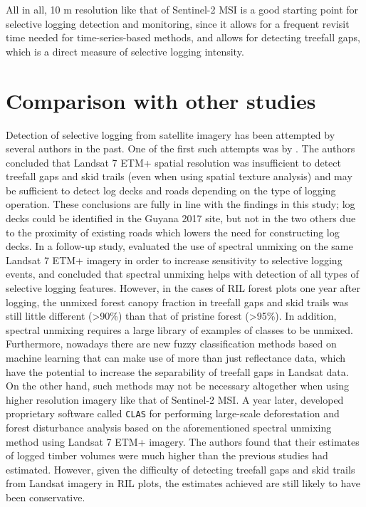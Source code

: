 \documentclass[a4paper,12pt]{scrbook}
\begin{document}
All in all, 10 m resolution like that of Sentinel-2 \ac{MSI} is a good starting point for selective logging detection and monitoring, since it allows for a frequent revisit time needed for time-series-based methods, and allows for detecting treefall gaps, which is a direct measure of selective logging intensity.

\section{Comparison with other studies}

Detection of selective logging from satellite imagery has been attempted by several authors in the past. One of the first such attempts was by \citet{asner_remote_2002}. The authors concluded that Landsat 7 \ac{ETM+} spatial resolution was insufficient to detect treefall gaps and skid trails (even when using spatial texture analysis) and may be sufficient to detect log decks and roads depending on the type of logging operation. These conclusions are fully in line with the findings in this study; log decks could be identified in the Guyana 2017 site, but not in the two others due to the proximity of existing roads which lowers the need for constructing log decks. In a follow-up study, \citet{asner_canopy_2004} evaluated the use of spectral unmixing on the same Landsat 7 \ac{ETM+} imagery in order to increase sensitivity to selective logging events, and concluded that spectral unmixing helps with detection of all types of selective logging features. However, in the cases of \ac{RIL} forest plots one year after logging, the unmixed forest canopy fraction in treefall gaps and skid trails was still little different (>90\%) than that of pristine forest (>95\%). In addition, spectral unmixing requires a large library of examples of classes to be unmixed. Furthermore, nowadays there are new fuzzy classification methods based on machine learning that can make use of more than just reflectance data, which have the potential to increase the separability of treefall gaps in Landsat data. On the other hand, such methods may not be necessary altogether when using higher resolution imagery like that of Sentinel-2 \ac{MSI}. A year later, \citet{asner_selective_2005} developed proprietary software called \texttt{CLAS} for performing large-scale deforestation and forest disturbance analysis based on the aforementioned spectral unmixing method using Landsat 7 \ac{ETM+} imagery. The authors found that their estimates of logged timber volumes were much higher than the previous studies had estimated. However, given the difficulty of detecting treefall gaps and skid trails from Landsat imagery in \ac{RIL} plots, the estimates achieved are still likely to have been conservative.
\end{document}
